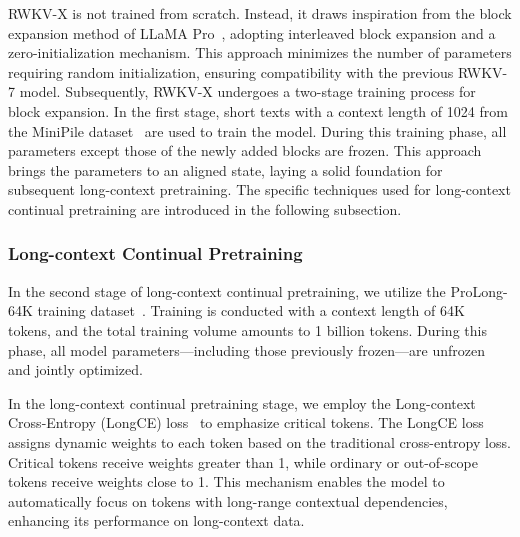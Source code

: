 RWKV-X is not trained from scratch. Instead, it draws inspiration from the block expansion method of LLaMA Pro~\cite{wu-etal-2024-llama}, adopting interleaved block expansion and a zero-initialization mechanism. 
This approach minimizes the number of parameters requiring random initialization, ensuring compatibility with the previous RWKV-7 model. 
Subsequently, RWKV-X undergoes a two-stage training process for block expansion.
In the first stage, short texts with a context length of 1024 from the MiniPile dataset~\cite{kaddour2023minipilechallengedataefficientlanguage} are used to train the model. 
During this training phase, all parameters except those of the newly added blocks are frozen. 
This approach brings the parameters to an aligned state, laying a solid foundation for subsequent long-context pretraining.
The specific techniques used for long-context continual pretraining are introduced in the following subsection.

\subsubsection{Long-context Continual Pretraining}

In the second stage of long-context continual pretraining, we utilize the ProLong-64K training dataset~\cite{gao2025trainlongcontextlanguagemodels}. Training is conducted with a context length of 64K tokens, and the total training volume amounts to 1 billion tokens.
During this phase, all model parameters—including those previously frozen—are unfrozen and jointly optimized.

In the long-context continual pretraining stage, we employ the Long-context Cross-Entropy (LongCE) loss~\cite{fang2025wrongperplexitylongcontextlanguage} to emphasize critical tokens. 
The LongCE loss assigns dynamic weights to each token based on the traditional cross-entropy loss. 
Critical tokens receive weights greater than 1, while ordinary or out-of-scope tokens receive weights close to 1. 
This mechanism enables the model to automatically focus on tokens with long-range contextual dependencies, enhancing its performance on long-context data.
